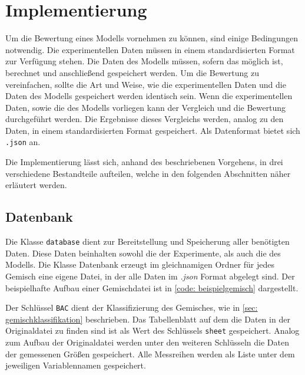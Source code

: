 \documentclass[../thesis.tex]{subfiles}
\begin{document}
\chapter{Implementierung}
\label{chp: implementierung}

Um die Bewertung eines Modells vornehmen zu können, sind einige Bedingungen notwendig. Die experimentellen Daten müssen in einem standardisierten Format zur Verfügung stehen. Die Daten des Modells müssen, sofern das möglich ist, berechnet und anschließend gespeichert werden. Um die Bewertung zu vereinfachen, sollte die Art und Weise, wie die experimentellen Daten und die Daten des Modells gespeichert werden identisch sein. Wenn die experimentellen Daten, sowie die des Modells vorliegen kann der Vergleich und die Bewertung durchgeführt werden. Die Ergebnisse dieses Vergleichs werden, analog zu den Daten, in einem standardisierten Format gespeichert. Als Datenformat bietet sich \texttt{.json} an.

Die Implementierung lässt sich, anhand des beschriebenen Vorgehens, in drei verschiedene Bestandteile aufteilen, welche in den folgenden Abschnitten näher erläutert werden.

\section{Datenbank}

Die Klasse \texttt{database} dient zur Bereitstellung und Speicherung aller benötigten Daten. Diese Daten beinhalten sowohl die der Experimente, als auch die des Modells. Die Klasse Datenbank erzeugt im gleichnamigen Ordner für jedes Gemisch eine eigene Datei, in der alle Daten im \textit{.json} Format abgelegt sind. Der beispielhafte Aufbau einer Gemischdatei ist in \autoref{code: beispielgemisch} dargestellt.


\label{code: beispielgemisch}

Der Schlüssel \texttt{BAC} dient der Klassifizierung des Gemisches, wie in \autoref{sec: gemischklassifikation} beschrieben. Das Tabellenblatt auf dem die Daten in der Originaldatei zu finden sind ist als Wert des Schlüssels \texttt{sheet} gespeichert. Analog zum Aufbau der Originaldatei werden unter den weiteren Schlüsseln die Daten der gemessenen Größen gespeichert. Alle Messreihen werden als Liste unter dem jeweiligen Variablennamen gespeichert.
\end{document}
